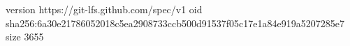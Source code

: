 version https://git-lfs.github.com/spec/v1
oid sha256:6a30e21786052018c5ea2908733ccb500d91537f05c17e1a84e919a5207285e7
size 3655
